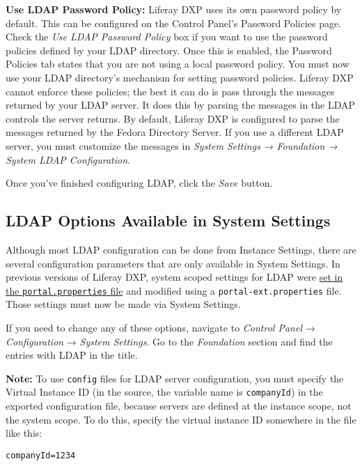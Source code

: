 \textbf{Use LDAP Password Policy:} Liferay DXP uses its own password
policy by default. This can be configured on the Control Panel's
Password Policies page. Check the \emph{Use LDAP Password Policy} box if
you want to use the password policies defined by your LDAP directory.
Once this is enabled, the Password Policies tab states that you are not
using a local password policy. You must now use your LDAP directory's
mechanism for setting password policies. Liferay DXP cannot enforce
these policies; the best it can do is pass through the messages returned
by your LDAP server. It does this by parsing the messages in the LDAP
controls the server returns. By default, Liferay DXP is configured to
parse the messages returned by the Fedora Directory Server. If you use a
different LDAP server, you must customize the messages in \emph{System
Settings → Foundation → System LDAP Configuration}.

Once you've finished configuring LDAP, click the \emph{Save} button.

\subsection{LDAP Options Available in System
Settings}\label{ldap-options-available-in-system-settings}

Although most LDAP configuration can be done from Instance Settings,
there are several configuration parameters that are only available in
System Settings. In previous versions of Liferay DXP, system scoped
settings for LDAP were
\href{https://docs.liferay.com/portal/6.2/propertiesdoc/portal.properties.html\#LDAP}{set
in the \texttt{portal.properties} file} and modified using a
\texttt{portal-ext.properties} file. Those settings must now be made via
System Settings.

If you need to change any of these options, navigate to \emph{Control
Panel} → \emph{Configuration} → \emph{System Settings}. Go to the
\emph{Foundation} section and find the entries with LDAP in the title.

\textbf{Note:} To use \texttt{config} files for LDAP server
configuration, you must specify the Virtual Instance ID (in the source,
the variable name is \texttt{companyId}) in the exported configuration
file, because servers are defined at the instance scope, not the system
scope. To do this, specify the virtual instance ID somewhere in the file
like this:

\begin{verbatim}
companyId=1234
\end{verbatim}

